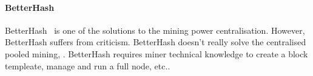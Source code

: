 \paragraph{\textbf{BetterHash}}
BetterHash~\cite{draft-bip-BetterHash} is one of the solutions to the mining power centralisation.
However, BetterHash suffers from criticism.
BetterHash doesn't really solve the centralised pooled mining, .
BetterHash requires miner technical knowledge to create a block templeate, manage and run a full node, etc..
